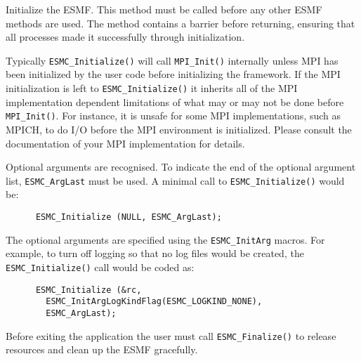     Initialize the ESMF.  This method must be called before
    any other ESMF methods are used.  The method contains a
    barrier before returning, ensuring that all processes
    made it successfully through initialization.
  
    Typically {\tt ESMC\_Initialize()} will call {\tt MPI\_Init()} 
    internally unless MPI has been initialized by the user code before
    initializing the framework. If the MPI initialization is left to
    {\tt ESMC\_Initialize()} it inherits all of the MPI implementation 
    dependent limitations of what may or may not be done before 
    {\tt MPI\_Init()}. For instance, it is unsafe for some MPI implementations,
    such as MPICH, to do I/O before the MPI environment is initialized. Please
    consult the documentation of your MPI implementation for details.
  
    Optional arguments are recognised.  To indicate the end of the optional
    argument list, {\tt ESMC\_ArgLast} must be used.  A minimal call to
    {\tt ESMC\_Initialize()} would be:
   \begin{verbatim}
      ESMC_Initialize (NULL, ESMC_ArgLast);\end{verbatim}
    The optional arguments are specified using the {\tt ESMC\_InitArg} macros.
    For example, to turn off logging so that no log files would be created, the
    {\tt ESMC\_Initialize()} call would be coded as:
   \begin{verbatim}
      ESMC_Initialize (&rc,
        ESMC_InitArgLogKindFlag(ESMC_LOGKIND_NONE),
        ESMC_ArgLast);\end{verbatim}
    Before exiting the application the user must call {\tt ESMC\_Finalize()}
    to release resources and clean up the ESMF gracefully.
  
